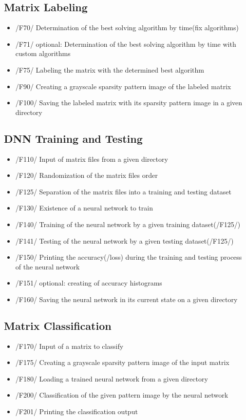 \documentclass[parskip=full]{scrartcl}
\begin{document}
\subsection{Matrix Labeling}
	\begin{itemize}
	\item /F70/ Determination of the best solving algorithm by time(fix algorithms)
	\item /F71/ optional: Determination of the best solving algorithm by time with custom algorithms
	\item /F75/ Labeling the matrix with the determined best algorithm
	\item /F90/ Creating a grayscale sparsity pattern image of the labeled matrix
	\item /F100/ Saving the labeled matrix with its sparsity pattern image in a given directory 
	\end{itemize}
	
	
\subsection{DNN Training and Testing}
	\begin{itemize}
	\item /F110/ Input of matrix files from a given directory
	\item /F120/ Randomization of the matrix files order
	\item /F125/ Separation of the matrix files into a training and testing dataset
	\item /F130/ Existence of a \gls{neural network} to train
	\item /F140/ Training of the \gls{neural network} by a given training dataset(/F125/)
	\item /F141/ Testing of the \gls{neural network} by a given testing dataset(/F125/)
	\item /F150/ Printing the accuracy(/loss) during the training and testing process of the \gls{neural network}
	\item /F151/ optional: creating of accuracy histograms
	\item /F160/ Saving the \gls{neural network} in its current state on a given directory
	\end{itemize}
 	
\subsection{Matrix Classification}
	\begin{itemize}
	\item /F170/ Input of a matrix to classify
	\item /F175/ Creating a grayscale sparsity pattern image of the input matrix
	\item /F180/ Loading a trained \gls{neural network} from a given directory
	\item /F200/ Classification of the given pattern image by the \gls{neural network}
	\item /F201/ Printing the classification output
	\end{itemize}
\end{document}
